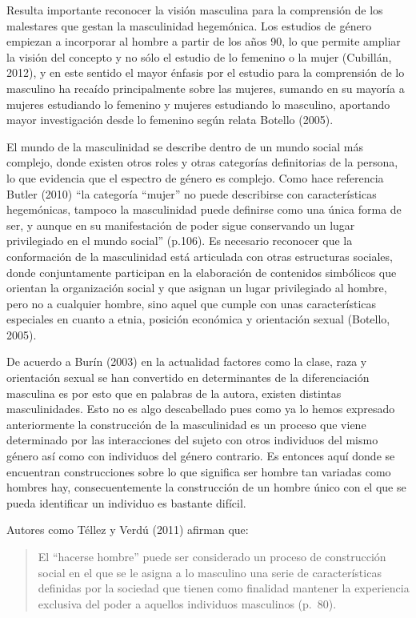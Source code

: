 Resulta importante reconocer la visión masculina para la comprensión de los
malestares que gestan la masculinidad hegemónica.
Los estudios de género empiezan a incorporar al hombre a partir de los años 90,
lo que permite ampliar la visión del concepto y no sólo el estudio de lo
femenino o la mujer (Cubillán, 2012), y en este sentido el mayor énfasis por el
estudio para la comprensión de lo masculino ha recaído principalmente sobre las
mujeres, sumando en su mayoría a mujeres estudiando lo femenino y mujeres
estudiando lo masculino, aportando mayor investigación desde lo femenino según
relata Botello (2005).

El mundo de la masculinidad se describe dentro de un mundo social más complejo,
donde existen otros roles y otras categorías definitorias de la persona, lo que
evidencia que el espectro de género es complejo.
Como hace referencia Butler (2010) “la categoría “mujer” no puede describirse
con características hegemónicas, tampoco la masculinidad puede definirse como
una única forma de ser, y aunque en su manifestación de poder sigue conservando
un lugar privilegiado en el mundo social” (p.106).
Es necesario reconocer que la conformación de la masculinidad está articulada
con otras estructuras sociales, donde conjuntamente participan en la elaboración
de contenidos simbólicos que orientan la organización social y que asignan un
lugar privilegiado al hombre, pero no a cualquier hombre, sino aquel que cumple
con unas características especiales en cuanto a etnia, posición económica y
orientación sexual (Botello, 2005).

De acuerdo a Burín (2003) en la actualidad factores como la clase, raza y
orientación sexual se han convertido en determinantes de la diferenciación
masculina es por esto que en palabras de la autora, existen distintas
masculinidades.
Esto no es algo descabellado pues como ya lo hemos expresado anteriormente la
construcción de la masculinidad es un proceso que viene determinado por las
interacciones del sujeto con otros individuos del mismo género así como con
individuos del género contrario.
Es entonces aquí donde se encuentran construcciones sobre lo que significa ser
hombre tan variadas como hombres hay, consecuentemente la construcción de un
hombre único con el que se pueda identificar un individuo es bastante difícil.

Autores como Téllez y Verdú (2011) afirman que:

\begin{quote}
    El “hacerse hombre” puede ser considerado un proceso de construcción social en
    el que se le asigna a lo masculino una serie de características definidas por la
    sociedad que tienen como finalidad mantener la experiencia exclusiva del poder a
    aquellos individuos masculinos (p.~80).
\end{quote}

